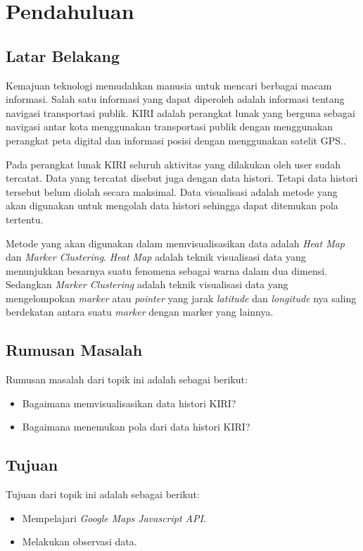 \chapter{Pendahuluan}
\label{chap:intro}
   
\section{Latar Belakang}
\label{sec:label}

Kemajuan teknologi memudahkan manusia untuk mencari berbagai macam informasi. Salah satu informasi yang dapat diperoleh adalah informasi tentang navigasi transportasi publik. KIRI  adalah perangkat lunak yang berguna sebagai navigasi antar kota menggunakan transportasi publik dengan menggunakan perangkat peta digital dan informasi posisi dengan menggunakan satelit GPS.\cite{pascal:17:KIRI}.

Pada perangkat lunak KIRI seluruh aktivitas yang dilakukan oleh user sudah tercatat. Data yang tercatat disebut juga dengan data histori. Tetapi data histori tersebut belum diolah secara maksimal. Data visualisasi adalah metode yang akan digunakan untuk mengolah data histori sehingga dapat ditemukan pola tertentu.

Metode yang akan digunakan dalam memvisualisasikan data adalah \textit{Heat Map} dan \textit{Marker Clustering}. \textit{Heat Map} adalah teknik visualisasi data yang menunjukkan besarnya suatu fenomena sebagai warna dalam dua dimensi. Sedangkan \textit{Marker Clustering}  adalah teknik visualisasi data  yang  mengelompokan \textit{marker} atau \textit{pointer} yang jarak \textit{latitude} dan \textit{longitude} nya saling berdekatan antara suatu \textit{marker} dengan marker yang lainnya.

\section{Rumusan Masalah}
\label{sec:rumusan}
Rumusan masalah dari topik ini adalah sebagai berikut:
\begin{itemize}
  \item Bagaimana memvisualisasikan data histori KIRI?
  \item Bagaimana menemukan pola dari data histori KIRI?


\end{itemize}

\section{Tujuan}
\label{sec:tujuan}
Tujuan dari topik ini adalah sebagai berikut:
\begin{itemize}
  \item Mempelajari \textit{Google Maps Javascript API}.
  \item Melakukan observasi data.


\end{itemize}

